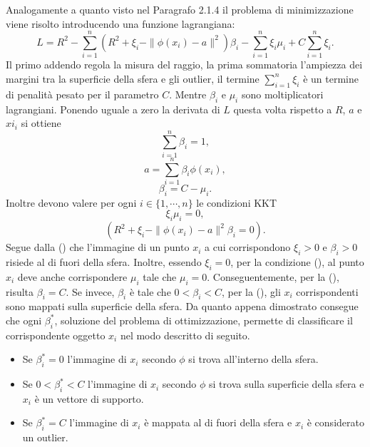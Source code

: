 \documentclass [11pt,a4paper,twoside,openright] {book}
\begin{document}
\noindent
Analogamente a quanto visto nel Paragrafo 2.1.4 il problema di minimizzazione viene risolto introducendo una funzione lagrangiana:
\begin{equation}
L = R^2 - \sum_{i=1}^n (R^2 + \xi_i - \parallel \phi(x_i) - a \parallel^2) \beta_i - \sum_{i=1}^n \xi_i \mu_i + C \sum_{i=1}^n \xi_i.
\end{equation}
Il primo addendo regola la misura del raggio, la prima sommatoria l'ampiezza dei margini tra la superficie della sfera e gli outlier, il termine $\sum_{i=1}^n\xi_i$ è un termine di penalità pesato per il parametro $C$. Mentre $\beta_i$ e $\mu_i$ sono moltiplicatori lagrangiani. Ponendo uguale a zero la derivata di $L$ questa volta rispetto a $R$, $a$ e $xi_i$ si ottiene
\begin{equation}\label{beta}
\sum_{i=1}^n \beta_i = 1,
\end{equation}
\begin{equation}\label{centro}
a = \sum_{i=1}^n \beta_i \phi(x_i),
\end{equation}
\begin{equation}\label{C}
\beta_i = C - \mu_i.
\end{equation}
Inoltre devono valere per ogni $i \in \lbrace 1, \cdots, n \rbrace$ le condizioni KKT
\begin{equation}\label{kkt1}
\xi_i\mu_i = 0,
\end{equation}
\begin{equation}\label{kkt2}
(R^2 + \xi_i - \parallel \phi(x_i)-a \parallel^2 \beta_i = 0).
\end{equation}
Segue dalla () che l'immagine di un punto $x_i$ a cui corrispondono $\xi_i > 0$ e $\beta_i > 0$ risiede al di fuori della sfera. Inoltre, essendo $\xi_i = 0$, per la condizione (), al punto $x_i$ deve anche corrispondere $\mu_i$ tale che $\mu_i = 0$. Conseguentemente, per la (), risulta $\beta_i = C$. Se invece, $\beta_i$ è tale che $0 < \beta_i < C$, per la (), gli $x_i$ corrispondenti sono mappati sulla superficie della sfera. Da quanto appena dimostrato consegue che ogni $\beta_i^*$, soluzione del problema di ottimizzazione, permette di classificare il corrispondente oggetto $x_i$ nel modo descritto di seguito.
\begin{itemize}
\item Se $\beta_i^*=0$ l'immagine di $x_i$ secondo $\phi$ si trova all'interno della sfera.
\item Se $0 < \beta_i^* < C$ l'immagine di $x_i$ secondo $\phi$ si trova sulla superficie della sfera e $x_i$ è un vettore di supporto.
\item Se $\beta_i^*=C$ l'immagine di $x_i$ è mappata al di fuori della sfera e $x_i$ è considerato un outlier.
\end{itemize}
\end{document}
